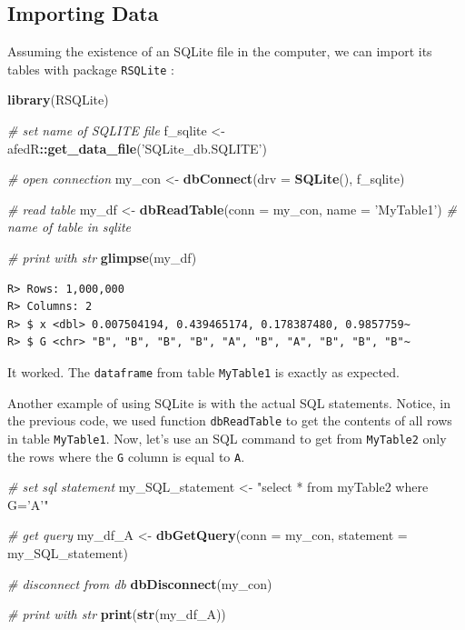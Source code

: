 \documentclass[
  12pt,
]{book}
\newenvironment{Shaded}{\begin{snugshade}}{\end{snugshade}}
\newcommand{\CommentTok}[1]{\textcolor[rgb]{0.37,0.37,0.37}{\textit{#1}}}
\newcommand{\DataTypeTok}[1]{\textcolor[rgb]{0.27,0.27,0.27}{#1}}
\newcommand{\KeywordTok}[1]{\textcolor[rgb]{0.27,0.27,0.27}{\textbf{#1}}}
\newcommand{\NormalTok}[1]{#1}
\newcommand{\OperatorTok}[1]{\textcolor[rgb]{0.43,0.43,0.43}{\textbf{#1}}}
\newcommand{\StringTok}[1]{\textcolor[rgb]{0.5,0.5,0.5}{#1}}
\begin{document}
\hypertarget{importing-data-4}{%
\subsection{Importing Data}\label{importing-data-4}}

Assuming the existence of an SQLite file in the computer, we can import its tables with package \texttt{RSQLite} \citep{R-RSQLite}:

\begin{Shaded}
\begin{Highlighting}[]
\KeywordTok{library}\NormalTok{(RSQLite)}

\CommentTok{# set name of SQLITE file}
\NormalTok{f_sqlite <-}\StringTok{ }\NormalTok{afedR}\OperatorTok{::}\KeywordTok{get_data_file}\NormalTok{(}\StringTok{'SQLite_db.SQLITE'}\NormalTok{)}

\CommentTok{# open connection}
\NormalTok{my_con <-}\StringTok{ }\KeywordTok{dbConnect}\NormalTok{(}\DataTypeTok{drv =} \KeywordTok{SQLite}\NormalTok{(), f_sqlite)}

\CommentTok{# read table}
\NormalTok{my_df <-}\StringTok{ }\KeywordTok{dbReadTable}\NormalTok{(}\DataTypeTok{conn =}\NormalTok{ my_con,}
                     \DataTypeTok{name =} \StringTok{'MyTable1'}\NormalTok{) }\CommentTok{# name of table in sqlite}

\CommentTok{# print with str}
\KeywordTok{glimpse}\NormalTok{(my_df)}
\end{Highlighting}
\end{Shaded}

\begin{verbatim}
R> Rows: 1,000,000
R> Columns: 2
R> $ x <dbl> 0.007504194, 0.439465174, 0.178387480, 0.9857759~
R> $ G <chr> "B", "B", "B", "B", "A", "B", "A", "B", "B", "B"~
\end{verbatim}

It worked. The \texttt{dataframe} from table \texttt{MyTable1} is exactly as expected. 

Another example of using SQLite is with the actual SQL statements. Notice, in the previous code, we used function \texttt{dbReadTable} to get the contents of all rows in table \texttt{MyTable1}. Now, let's use an SQL command to get from \texttt{MyTable2} only the rows where the \texttt{G} column is equal to \texttt{A}.

\begin{Shaded}
\begin{Highlighting}[]
\CommentTok{# set sql statement}
\NormalTok{my_SQL_statement <-}\StringTok{ "select * from myTable2 where G='A'"}

\CommentTok{# get query}
\NormalTok{my_df_A <-}\StringTok{ }\KeywordTok{dbGetQuery}\NormalTok{(}\DataTypeTok{conn =}\NormalTok{ my_con, }
                      \DataTypeTok{statement =}\NormalTok{ my_SQL_statement)}

\CommentTok{# disconnect from db}
\KeywordTok{dbDisconnect}\NormalTok{(my_con)}

\CommentTok{# print with str}
\KeywordTok{print}\NormalTok{(}\KeywordTok{str}\NormalTok{(my_df_A))}
\end{Highlighting}
\end{Shaded}
\end{document}
